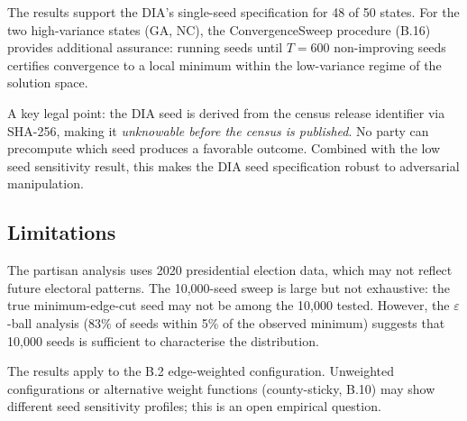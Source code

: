 The results support the DIA's single-seed specification for 48 of 50 states.
For the two high-variance states (GA, NC), the ConvergenceSweep procedure
(B.16) provides additional assurance: running seeds until $T = 600$
non-improving seeds certifies convergence to a local minimum within
the low-variance regime of the solution space.

A key legal point: the DIA seed is derived from the census release
identifier via SHA-256, making it \emph{unknowable before the census
is published}.  No party can precompute which seed produces a favorable
outcome.  Combined with the low seed sensitivity result, this makes the
DIA seed specification robust to adversarial manipulation.

\subsection{Limitations}

The partisan analysis uses 2020 presidential election data, which may
not reflect future electoral patterns.  The 10,000-seed sweep is large
but not exhaustive: the true minimum-edge-cut seed may not be among
the 10,000 tested.  However, the $\varepsilon$-ball analysis
($83\%$ of seeds within 5\% of the observed minimum) suggests that
10,000 seeds is sufficient to characterise the distribution.

The results apply to the B.2 edge-weighted configuration.  Unweighted
configurations or alternative weight functions (county-sticky, B.10) may
show different seed sensitivity profiles; this is an open empirical question.
